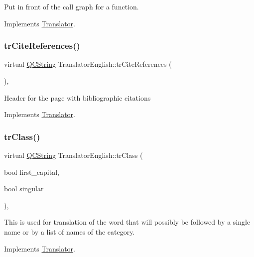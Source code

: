 Put in front of the call graph for a function. 

Implements \mbox{\hyperlink{class_translator}{Translator}}.

\mbox{\label{class_translator_english_a8d1b66e7cc2978c63cf6f4d97cbd9f9c}} 
\subsubsection{\texorpdfstring{trCiteReferences()}{trCiteReferences()}}
{\footnotesize\ttfamily virtual \mbox{\hyperlink{class_q_c_string}{Q\+C\+String}} Translator\+English\+::tr\+Cite\+References (\begin{DoxyParamCaption}{ }\end{DoxyParamCaption})\hspace{0.3cm}{\ttfamily [inline]}, {\ttfamily [virtual]}}

Header for the page with bibliographic citations 

Implements \mbox{\hyperlink{class_translator}{Translator}}.

\mbox{\label{class_translator_english_aff7117d56b042c724232f7e430067260}} 
\subsubsection{\texorpdfstring{trClass()}{trClass()}}
{\footnotesize\ttfamily virtual \mbox{\hyperlink{class_q_c_string}{Q\+C\+String}} Translator\+English\+::tr\+Class (\begin{DoxyParamCaption}\item[{bool}]{first\+\_\+capital,  }\item[{bool}]{singular }\end{DoxyParamCaption})\hspace{0.3cm}{\ttfamily [inline]}, {\ttfamily [virtual]}}

This is used for translation of the word that will possibly be followed by a single name or by a list of names of the category. 

Implements \mbox{\hyperlink{class_translator}{Translator}}.

